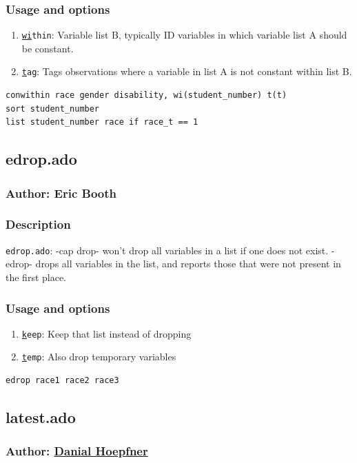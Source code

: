 {\subsubsection{Usage and options}
\begin{enumerate}
\item \texttt{\underline{wi}thin}: Variable list B, typically ID variables in which variable list A should be constant.
\item \texttt{\underline{t}ag}: Tags observations where a variable in list A is not constant within list B.
\end{enumerate}
\begin{lstlisting}
conwithin race gender disability, wi(student_number) t(t)
sort student_number
list student_number race if race_t == 1
\end{lstlisting}


\subsection{edrop.ado}
\subsubsection{Author: Eric Booth}
\subsubsection{Description}
\texttt{edrop.ado}: -cap drop- won't drop all variables in a list if one does not exist. -edrop- drops all variables in the list, and reports those that were not present in the first place.
\subsubsection{Usage and options}
\begin{enumerate}
\item \texttt{\underline{k}eep}: Keep that list instead of dropping
\item \texttt{\underline{t}emp}: Also drop temporary variables
\end{enumerate}

\begin{lstlisting}
edrop race1 race2 race3
\end{lstlisting}

\subsection{latest.ado}
\subsubsection{Author: \href{mailto:dhoepfner@gibsonconsult.com}{Danial Hoepfner}}
}
